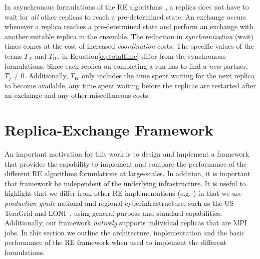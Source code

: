 \documentclass{rspublic}
\newcommand{\jhanote}[1]{ {\textcolor{red} { ***shantenu: #1 }}}
\newcommand{\alnote}[1]{ {\textcolor{blue} { ***andre: #1 }}}
\newcommand{\athotanote}[1]{ {\textcolor{green} { ***athota: #1 }}}
\newcommand{\alnote}[1]{}
\newcommand{\athotanote}[1]{}
\newcommand{\jhanote}[1]{}
\begin{document}
In asynchronous formulations of the RE
algorithms~\citep{parashar_arepex,DBLP:journals/jcc/GallicchioLP08}, a
replica does not have to wait for {\it all} other replicas to reach a
pre-determined state. An exchange occurs whenever a replica reaches a
pre-determined state and perform an exchange with another suitable
replica in the ensemble.  The reduction in {\it synchronization}
(wait) times comes at the cost of increased {\it coordination} costs.
The specific values of the terms $T_{X}$ and $T_W$, in
Equation\ref{eq:totaltime} differ from the synchronous formulations.
Since each replica on completing a run has to find a {\it new}
partner, $T_f \neq 0$.  Additionally, $T_W$ only includes the time
spent waiting for the next replica to become available, any time spent
waiting before the replicas are restarted after an exchange and any
other miscellaneous costs.




\section{Replica-Exchange Framework}\label{repexfw}

An important motivation for this work is to design and implement a
framework that provides the capability to implement and compare the
performance of the different RE algorithms formulations at
large-scales.  In addition, it is important that framework be
independent of the underlying infrastructure.  It is useful to
highlight that we differ from other RE implementations (e.g.
\cite{parashar_arepex}) in that we use {\it production grade}
national and regional cyberinfrastructure, such as the US TeraGrid and
LONI~\citep{LONI_web}, using general purpose and standard
capabilities.  Additionally, our framework {\it natively} supports
individual replicas that are MPI jobs. In this section we outline the
architecture, implementation and the basic performance of the RE
framework when used to implement the different formulations.
\end{document}
